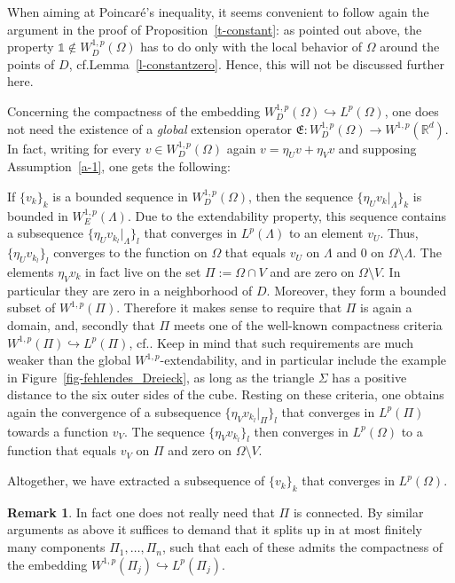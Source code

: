 \documentclass[10pt,leqno]{amsart}
\theoremstyle{definition}
\newtheorem{remark}[theorem]{Remark}
\numberwithin{equation}{section}
\begin{document}
When aiming at Poincar\'e's inequality, it seems convenient to follow again the
argument in the proof of Proposition~\ref{t-constant}: as pointed out above, the
property $\mathds{1} \notin W^{1,p}_D(\Omega)$ has to do only with the local
behavior of $\Omega$ around the points of $D$,
cf.\@ Lemma~\ref{l-constantzero}. Hence, this will not be discussed further
here.

Concerning the compactness of the embedding $W^{1,p}_D(\Omega) \hookrightarrow
L^p(\Omega)$, one does not need the existence of a \emph{global} extension
operator $\mathfrak E : W^{1,p}_D(\Omega) \to W^{1,p}({{\mathbb R}}^d)$. In fact, writing
for every $v \in W^{1,p}_D(\Omega)$ again $v = \eta_U v + \eta_V v$ and
supposing Assumption~\ref{a-1}, one gets the following: 

If $\{v_k\}_k$ is a bounded sequence in $W^{1,p}_D(\Omega)$, then the sequence
$\{\eta_U v_k|_\Lambda\}_k$ is bounded in $W^{1,p}_E(\Lambda)$. Due to the
extendability property, this sequence contains a subsequence $\{\eta_U
v_{k_l}|_\Lambda\}_l$ that converges in $L^p(\Lambda)$ to an element $v_U$.
Thus, $\{\eta_U v_{k_l}\}_l$ converges to the function on $\Omega$ that equals
$v_U$ on $\Lambda$ and $0$ on $\Omega \setminus \Lambda$. The elements $\eta_V
v_k$ in fact live on the set $\Pi := \Omega \cap V$ and
are zero on $\Omega \setminus V$. In particular they are zero in a
neighborhood of $D$. Moreover, they form a bounded subset of $W^{1,p}(\Pi)$.
Therefore it makes sense to require that $\Pi$ is again a domain, and,
secondly that $\Pi$ meets one of the well-known compactness criteria
$W^{1,p}(\Pi) \hookrightarrow L^p(\Pi)$, cf.\@ \cite[Ch.~1.4.6]{mazsob}. Keep in
mind that such requirements are much weaker than the global
$W^{1,p}$-extendability, and in particular include the example in
Figure~\ref{fig-fehlendes_Dreieck}, as long as the triangle $\Sigma$ has a
positive distance to the six outer sides of the cube. Resting on these criteria,
one obtains again the convergence of a subsequence $\{\eta_V v_{k_l}|_{\Pi}\}_l$
that converges in $L^p(\Pi)$ towards a function $v_V$. The sequence
$\{\eta_V v_{k_l}\}_l$ then converges in $L^p(\Omega)$ to a function that equals
$v_V$ on $\Pi$ and zero on $\Omega \setminus V$.

Altogether, we have extracted a subsequence of $\{v_k\}_k$ that converges in
$L^p(\Omega)$.

\begin{remark} \label{r-zusammh}
 In fact one does not really need that $\Pi$ is connected. By similar
 arguments as above it suffices to demand that it splits up in at most finitely
 many components $\Pi_1, \ldots, \Pi_n$, such that each of these admits the
 compactness of the embedding $W^{1,p}(\Pi_j) \hookrightarrow L^p(\Pi_j)$.
\end{remark}
\end{document}
